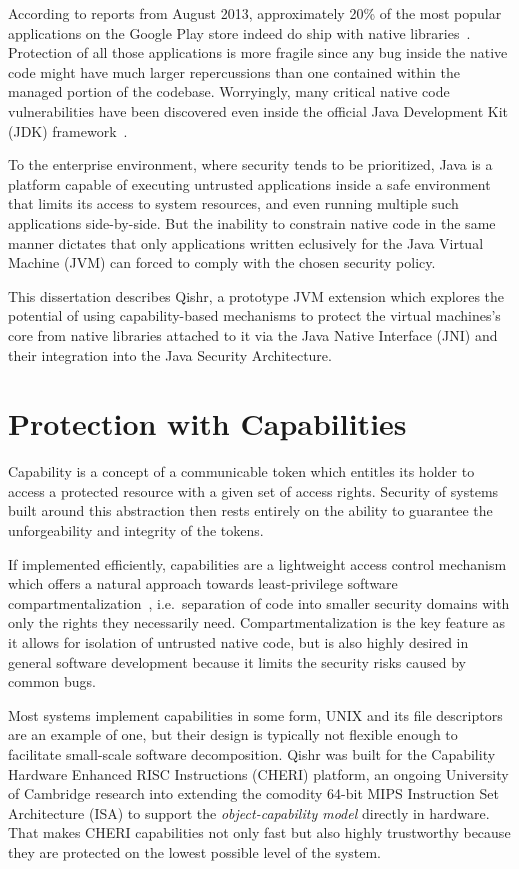 \documentclass[a4paper,12pt,twoside,openright]{report}
\begin{document}
According to reports from August 2013, approximately 20\% of the most popular applications on the Google Play store indeed do ship with native libraries~\cite{poeplau2014execute}. Protection of all those applications is more fragile since any bug inside the native code might have much larger repercussions than one contained within the managed portion of the codebase. Worryingly, many critical native code vulnerabilities have been discovered even inside the official Java Development Kit (JDK) framework~\cite{Tan:2008:ESS:1496711.1496736}. 

To the enterprise environment, where security tends to be prioritized, Java is a platform capable of executing untrusted applications inside a safe environment that limits its access to system resources, and even running multiple such applications side-by-side. But the inability to constrain native code in the same manner dictates that only applications written eclusively for the Java Virtual Machine (JVM) can forced to comply with the chosen security policy.

This dissertation describes Qishr, a prototype JVM extension which explores the potential of using capability-based mechanisms to protect the virtual machines's core from native libraries attached to it via the Java Native Interface (JNI) and their integration into the Java Security Architecture.

\section{Protection with Capabilities}

Capability is a concept of a communicable token which entitles its holder to access a protected resource with a given set of access rights. Security of systems built around this abstraction then rests entirely on the ability to guarantee the unforgeability and integrity of the tokens.

If implemented efficiently, capabilities are a lightweight access control mechanism which offers a natural approach towards least-privilege software compartmentalization~\cite{Watson:2010:CPC:1929820.1929824}, i.e.\ separation of code into smaller security domains with only the rights they necessarily need. Compartmentalization is the key feature as it allows for isolation of untrusted native code, but is also highly desired in general software development because it limits the security risks caused by common bugs.

Most systems implement capabilities in some form, UNIX and its file descriptors are an example of one, but their design is typically not flexible enough to facilitate small-scale software decomposition. Qishr was built for the Capability Hardware Enhanced RISC Instructions (CHERI) platform, an ongoing University of Cambridge research into extending the comodity 64-bit MIPS Instruction Set Architecture (ISA) to support the \emph{object-capability model} directly in hardware. That makes CHERI capabilities not only fast but also highly trustworthy because they are protected on the lowest possible level of the system.
\end{document}
